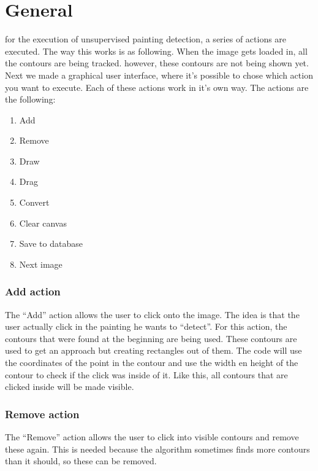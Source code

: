 \section{General}
for the execution of unsupervised painting detection, a series of actions are executed. The way this works is as following. When the image gets loaded in, all the contours are being tracked. however, these contours are not being shown yet. Next we made a graphical user interface, where it's possible to chose which action you want to execute. Each of these actions work in it's own way. The actions are the following:
\begin{enumerate}
    \item Add
    \item Remove
    \item Draw
    \item Drag
    \item Convert
    \item Clear canvas
    \item Save to database
    \item Next image
\end{enumerate}

\subsubsection{Add action}
The ``Add'' action allows the user to click onto the image. The idea is that the user actually click in the painting he wants to ``detect''. For this action, the contours that were found at the beginning are being used. These contours are used to get an approach but creating rectangles out of them. The code will use the coordinates of the point in the contour and use the width en height of the contour to check if the click was inside of it. Like this, all contours that are clicked inside will be made visible.

\subsubsection{Remove action}
The ``Remove'' action allows the user to click into visible contours and remove these again. This is needed because the algorithm sometimes finds more contours than it should, so these can be removed.

